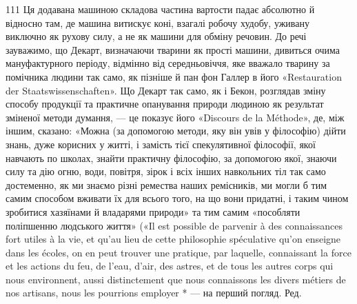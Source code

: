 111 Ця додавана машиною складова частина вартости падає абсолютно
й відносно там, де машина витискує коні, взагалі робочу худобу,
уживану виключно як рухову силу, а не як машини для обміну речовин.
До речі зауважимо, що Декарт, визначаючи тварини як прості машини,
дивиться очима мануфактурного періоду, відмінно від середньовіччя,
яке вважало тварину за помічника людини так само, як пізніше й пан
фон Галлер в його «Restauration der Staatswissenschaften». Що Декарт
так само, як і Бекон, розглядав зміну способу продукції та практичне
опанування природи людиною як результат зміненої методи думання, —
це показує його «Discours de la Méthode», де, між іншим, сказано: «Можна
(за допомогою методи, яку він увів у філософію) дійти знань, дуже корисних
у житті, і замість тієї спекулятивної філософії, якої навчають по школах,
знайти практичну філософію, за допомогою якої, знаючи силу та дію
огню, води, повітря, зірок і всіх інших навкольних тіл так само достеменно,
як ми знаємо різні ремества наших ремісників, ми могли б тим
самим способом вживати їх для всього того, на що вони придатні, і таким
чином зробитися хазяїнами й владарями природи» та тим самим «пособляти
поліпшенню людського життя» («Il est possible de parvenir à des connaissances
fort utiles à la vie, et qu'au lieu de cette philosophie spéculative
qu’on enseigne dans les écoles, on en peut trouver une pratique, par laquelle,
connaissant la force et les actions du feu, de l’eau, d’air, des astres, et de
tous les autres corps qui nous environnent, aussi distinctement que nous
connaissons les divers métiers de nos artisans, nous les pourrions employer
* — на перший погляд. Ред.
